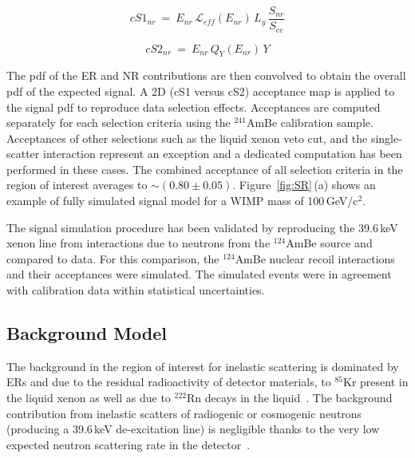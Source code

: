 \begin{equation}
cS1_{nr} ~=~ E_{nr} \, \mathcal{L}_{eff}(E_{nr}) \, L_{y} \, \frac{S_{nr}}{S_{ee}}
\label{f:cs1}
\end{equation}

\begin{equation}
cS2_{nr}  ~ = ~ E_{nr} \, Q_{Y}(E_{nr}) \, Y
\label{f:cs2}
\end{equation}

The pdf of the ER and NR contributions are then convolved  to obtain the overall pdf of the expected signal.
A 2D (cS1 versus cS2) acceptance map is applied to the signal pdf to reproduce data selection effects. Acceptances are computed separately for each selection 
criteria using the $^{241}$AmBe calibration sample. Acceptances of other selections such as the liquid xenon veto cut, and the single-scatter interaction represent an exception  and 
a dedicated computation has been performed in these cases. The combined acceptance  of all selection criteria in the region of interest averages to $\sim$$(0.80\pm0.05)$. 
Figure~\ref{fig:SR}\,(a) shows an example of fully simulated signal model for a WIMP mass of 100\,GeV/c$^2$. 

The signal simulation procedure has been validated by reproducing the 39.6\,keV xenon line from interactions due to neutrons from the 
$^{124}$AmBe source and compared to data. For this comparison, the  $^{124}$AmBe nuclear recoil interactions and their acceptances
were simulated. The simulated events were in agreement  with calibration data within statistical uncertainties. 



\subsection {Background Model}

The background in the region of interest for inelastic scattering is dominated by ERs and due to the residual radioactivity of detector materials, to $^{85}$Kr present in the liquid xenon as well as due to $^{222}$Rn decays in the liquid~\cite{Aprile:2011vb}. The background contribution from inelastic scatters of radiogenic or cosmogenic neutrons (producing a 39.6\,keV de-excitation line) is negligible thanks to the very low expected neutron scattering rate in the detector~\cite{Aprile:2013tov}.



